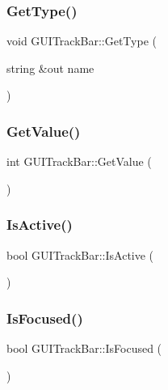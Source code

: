 \subsubsection{\texorpdfstring{Get\+Type()}{GetType()}}
{\footnotesize\ttfamily void G\+U\+I\+Track\+Bar\+::\+Get\+Type (\begin{DoxyParamCaption}\item[{string \&out}]{name }\end{DoxyParamCaption})}

\hypertarget{class_g_u_i_track_bar_aa832e8d88c6b29ed1b8f4b23fa196c3a}{}\label{class_g_u_i_track_bar_aa832e8d88c6b29ed1b8f4b23fa196c3a} 
\subsubsection{\texorpdfstring{Get\+Value()}{GetValue()}}
{\footnotesize\ttfamily int G\+U\+I\+Track\+Bar\+::\+Get\+Value (\begin{DoxyParamCaption}{ }\end{DoxyParamCaption})}

\hypertarget{class_g_u_i_track_bar_aba2a6854a2821e237d29ce31b2f8d2b5}{}\label{class_g_u_i_track_bar_aba2a6854a2821e237d29ce31b2f8d2b5} 
\subsubsection{\texorpdfstring{Is\+Active()}{IsActive()}}
{\footnotesize\ttfamily bool G\+U\+I\+Track\+Bar\+::\+Is\+Active (\begin{DoxyParamCaption}{ }\end{DoxyParamCaption})}

\hypertarget{class_g_u_i_track_bar_a8a67b58ba7308d3bd6a78eeb34e032fd}{}\label{class_g_u_i_track_bar_a8a67b58ba7308d3bd6a78eeb34e032fd} 
\subsubsection{\texorpdfstring{Is\+Focused()}{IsFocused()}}
{\footnotesize\ttfamily bool G\+U\+I\+Track\+Bar\+::\+Is\+Focused (\begin{DoxyParamCaption}{ }\end{DoxyParamCaption})}

